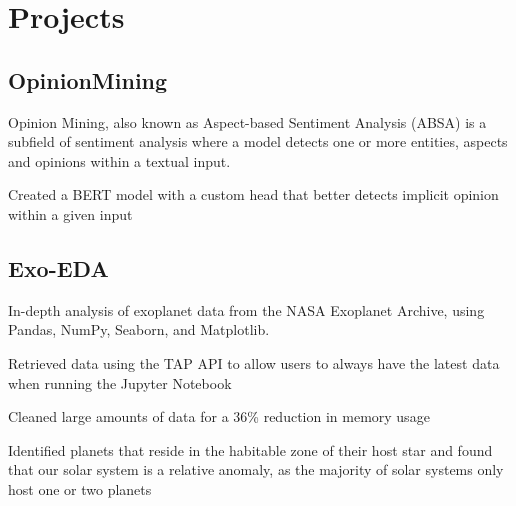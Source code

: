 \documentclass[]{resume-template}
\begin{document}
    \begin{minipage}[t]{0.66\textwidth}


        \section{Projects}\label{sec:projects}

        \subsection{OpinionMining}\label{subsec:opinionmining}
        \vspace{\topsep}
        \begin{tightemize}
            \item Opinion Mining, also known as Aspect-based Sentiment Analysis (ABSA) is a subfield of sentiment analysis
            where a model detects one or more entities, aspects and opinions within a textual input.
            \item Created a BERT model with a custom head that better detects implicit opinion within a given input

        \end{tightemize}

        \subsection{Exo-EDA}\label{subsec:exo-eda}
        \vspace{\topsep} %
        \begin{tightemize}
            \item In-depth analysis of exoplanet data from the NASA Exoplanet Archive, using Pandas, NumPy,
            Seaborn, and Matplotlib.
            \item Retrieved data using the TAP API to allow users to always have the latest data when running the Jupyter Notebook
            \item Cleaned large amounts of data for a 36\% reduction in memory usage
            \item Identified planets that reside in the habitable zone of their host star and found that our solar system is a
            relative anomaly, as the majority of solar systems only host one or two planets
        \end{tightemize}


\end{minipage}
\end{document}
